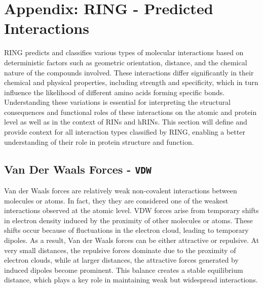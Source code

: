 \section{Appendix: RING - Predicted Interactions} 
\label{appendix:RING-inter}
RING predicts and classifies various types of molecular interactions based on deterministic factors such as geometric orientation, distance, and the chemical nature of the compounds involved. These interactions differ significantly in their chemical and physical properties, including strength and specificity, which in turn influence the likelihood of different amino acids forming specific bonds. Understanding these variations is essential for interpreting the structural consequences and functional roles of these interactions on the atomic and protein level as well as in the context of RINs and hRINs. This section will define and provide context for all interaction types classified by RING, enabling a better understanding of their role in protein structure and function.

\subsection{Van Der Waals Forces - \texttt{VDW}}
Van der Waals forces are relatively weak non-covalent interactions between molecules or atoms. In fact, they they are considered one of the weakest interactions observed at the atomic level. 
VDW forces arise from temporary shifts in electron density induced by the proximity of other molecules or atoms. These shifts occur because of fluctuations in the electron cloud, leading to temporary dipoles. As a result, Van der Waals forces can be either attractive or repulsive.
At very small distances, the repulsive forces dominate due to the proximity of electron clouds, while at larger distances, the attractive forces generated by induced dipoles become prominent. This balance creates a stable equilibrium distance, which plays a key role in maintaining weak but widespread interactions.

